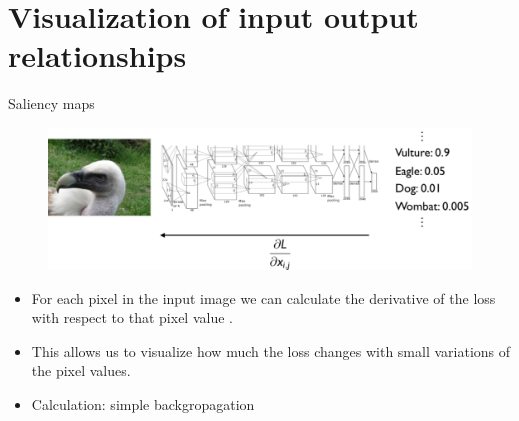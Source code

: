 \documentclass[xcolor=pdftex,dvipsnames,table]{beamer}
\begin{document}
\section{Visualization of input output relationships}

\begin{frame}{Saliency maps}
	\begin{figure}[htb]
	  \centering
	  \includegraphics[width=\textwidth]{../graphics/Vis_saliency_map_principle.pdf}
	\end{figure}
\begin{itemize}
	\item For each pixel in the input image we can calculate the derivative of the loss with respect to that pixel value \cite{Simonyan:2013}.
	\item This allows us to visualize how much the loss changes with small variations of the pixel values.
	\item Calculation: simple backgropagation 
\end{itemize}
\end{frame}

\end{document}
